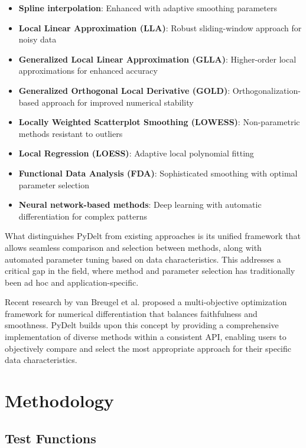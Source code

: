 \documentclass[10pt,journal,compsoc]{IEEEtran}
\begin{document}
\begin{itemize}
    \item \textbf{Spline interpolation}: Enhanced with adaptive smoothing parameters
    \item \textbf{Local Linear Approximation (LLA)}: Robust sliding-window approach for noisy data
    \item \textbf{Generalized Local Linear Approximation (GLLA)}: Higher-order local approximations for enhanced accuracy
    \item \textbf{Generalized Orthogonal Local Derivative (GOLD)}: Orthogonalization-based approach for improved numerical stability
    \item \textbf{Locally Weighted Scatterplot Smoothing (LOWESS)}: Non-parametric methods resistant to outliers
    \item \textbf{Local Regression (LOESS)}: Adaptive local polynomial fitting
    \item \textbf{Functional Data Analysis (FDA)}: Sophisticated smoothing with optimal parameter selection
    \item \textbf{Neural network-based methods}: Deep learning with automatic differentiation for complex patterns
\end{itemize}

What distinguishes PyDelt from existing approaches is its unified framework that allows seamless comparison and selection between methods, along with automated parameter tuning based on data characteristics. This addresses a critical gap in the field, where method and parameter selection has traditionally been ad hoc and application-specific.

Recent research by van Breugel et al. \cite{van2021numerical} proposed a multi-objective optimization framework for numerical differentiation that balances faithfulness and smoothness. PyDelt builds upon this concept by providing a comprehensive implementation of diverse methods within a consistent API, enabling users to objectively compare and select the most appropriate approach for their specific data characteristics.

\section{Methodology}

\subsection{Test Functions}
\end{document}
